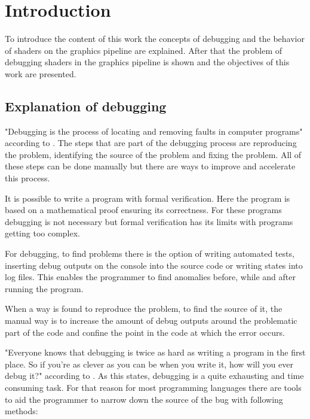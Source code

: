 
\chapter{Introduction}\label{cha:Introduction}

To introduce the content of this work the concepts of debugging and the behavior of shaders on the graphics pipeline are explained. After that the problem of debugging shaders in the graphics pipeline is shown and the objectives of this work are presented.

\section{Explanation of debugging}
\label{paragraph:debuging}

"Debugging is the process of locating and removing faults in computer programs" according to . The steps that are part of the debugging process are reproducing the problem, identifying the source of the problem and fixing the problem. All of these steps can be done manually but there are ways to improve and accelerate this process.

It is possible to write a program with formal verification. Here the program is based on a mathematical proof ensuring its correctness. For these programs debugging is not necessary but formal verification has its limits with programs getting too complex. 

For debugging, to find problems there is the option of writing automated tests, inserting debug outputs on the console into the source code or writing states into log files. This enables the programmer to find anomalies before, while and after running the program.

When a way is found to reproduce the problem, to find the source of it, the manual way is to increase the amount of debug outputs around the problematic part of the code and confine the point in the code at which the error occurs.

"Everyone knows that debugging is twice as hard as writing a program in the first place. So if you're as clever as you can be when you write it, how will you ever debug it?" according to . As this states, debugging is a quite exhausting and time consuming task. For that reason for most programming languages there are tools to aid the programmer to narrow down the source of the bug with following methods:

